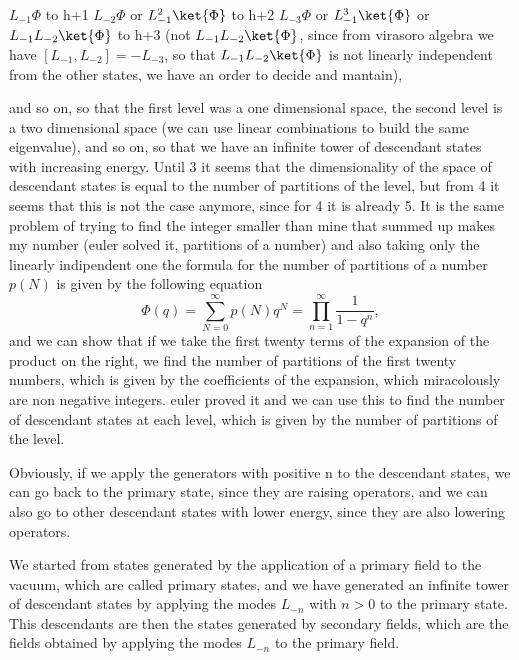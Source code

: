 \(L_{-1} \Phi\) to h+1
\(L_{-2} \Phi\) or \(L_{-1}^2 \ket{\Phi}\) to h+2
\(L_{-3} \Phi\) or \(L_{-1}^3 \ket{\Phi}\) or \(L_{-1} L_{-2} \ket{\Phi}\) to h+3 (not \(L_{-1}L_{-2}\ket{\Phi}\), since from virasoro algebra we have \([L_{-1}, L_{-2}] = -L_{-3}\), so that \(L_{-1} L_{-2} \ket{\Phi}\) is not linearly independent from the other states, we have an order to decide and mantain),

and so on, so that the first level was a one dimensional space, the second level is a two dimensional space (we can use linear combinations to build the same eigenvalue), and so on, so that we have an infinite tower of descendant states with increasing energy.
Until 3 it seems that the dimensionality of the space of descendant states is equal to the number of partitions of the level, but from 4 it seems that this is not the case anymore, since for 4 it is already 5. It is the same problem of trying to find the integer smaller than mine that summed up makes my number (euler solved it, partitions of a number) and also taking only the linearly indipendent one
the formula for the number of partitions of a number \(p(N)\) is given by the following equation
\[
    \Phi(q) = \sum_{N=0}^{\infty} p(N) q^N = \prod_{n=1}^{\infty} \frac{1}{1-q^n},
\]
and we can show that if we take the first twenty terms of the expansion of the product on the right, we find the number of partitions of the first twenty numbers, which is given by the coefficients of the expansion, which miracolously are non negative integers. euler proved it and we can use this to find the number of descendant states at each level, which is given by the number of partitions of the level.

Obviously, if we apply the generators with positive n to the descendant states, we can go back to the primary state, since they are raising operators, and we can also go to other descendant states with lower energy, since they are also lowering operators.

We started from states generated by the application of a primary field to the vacuum, which are called primary states, and we have generated an infinite tower of descendant states by applying the modes \(L_{-n}\) with \(n>0\) to the primary state. This descendants are then the states generated by secondary fields, which are the fields obtained by applying the modes \(L_{-n}\) to the primary field.

